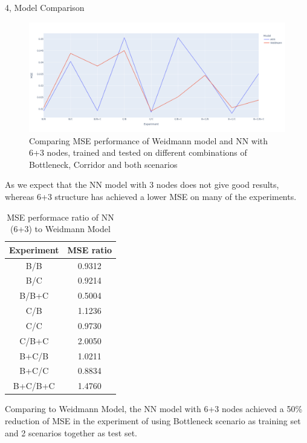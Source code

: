 \documentclass[10pt,a4paper]{article}
\begin{document}
\begin{task}{4, Model Comparison}
\begin{figure} [H]
    \centering
    \includegraphics[width=15cm]{images/Compare_6+3.png}
    \caption{Comparing MSE performance of Weidmann model and NN with 6+3 nodes, trained and tested on different combinations of Bottleneck, Corridor and both scenarios}
    \label{Weidmann-b}
\end{figure}

As we expect that the NN model with 3 nodes does not give good results, whereas 6+3 structure has achieved a lower MSE on many of the experiments.

\begin{table}[H]
    \centering
    \caption{MSE performace ratio of NN (6+3) to Weidmann Model}
    \begin{tabular}{c|c}
        Experiment & MSE ratio \\
        \hline
        B/B & 0.9312 \\
        B/C & 0.9214 \\
        B/B+C & 0.5004 \\
        C/B & 1.1236 \\
        C/C & 0.9730 \\
        C/B+C & 2.0050 \\
        B+C/B & 1.0211 \\
        B+C/C & 0.8834 \\
        B+C/B+C & 1.4760
    \end{tabular}
    \label{tab}
\end{table}

Comparing to Weidmann Model, the NN model with 6+3 nodes achieved a 50\% reduction of MSE in the experiment of using Bottleneck scenario as training set and 2 scenarios together as test set. 

\end{task}

\newpage
\end{document}
